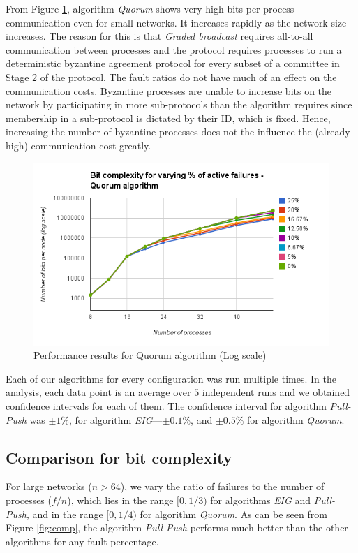 From Figure \ref{fig:quorum}, algorithm \textit{Quorum} shows very high bits
per process communication even for small networks. It increases rapidly as the
network size increases. The reason for this is that \textit{Graded broadcast}
requires all-to-all communication between processes and the protocol requires
processes to run a deterministic byzantine agreement protocol for every subset
of a committee in Stage $2$ of the protocol. The fault ratios do not have much
of an effect on the communication costs. Byzantine processes are unable to
increase bits on the network by participating in more sub-protocols than the
algorithm requires since membership in a sub-protocol is dictated by their ID,
which is fixed. Hence, increasing the number of byzantine processes does not
the influence the (already high) communication cost greatly.
\begin{figure}[ht] \centering \includegraphics[scale=0.4]{quorum}
     \caption{Performance results for Quorum algorithm (Log
    scale)} \label{fig:quorum}  \end{figure}

Each of our algorithms for every configuration was run multiple times. In the
analysis, each data point is an average over $5$ independent runs and we
obtained confidence intervals for each of them. The confidence interval for
algorithm \textit{Pull-Push} was $\pm 1\%$, for algorithm \textit{EIG}---$\pm
0.1\%$, and $\pm 0.5\%$ for algorithm \textit{Quorum}.

\subsection{Comparison for bit complexity} For large networks ($n > 64$), we
vary the ratio of failures to the number of processes ($f/n$), which lies in
the range $[0, 1/3)$ for algorithms \textit{EIG} and \textit{Pull-Push}, and in
    the range $[0, 1/4)$ for algorithm \textit{Quorum}.  As can be seen from
        Figure \ref{fig:comp}, the algorithm \textit{Pull-Push} performs much
        better than the other algorithms for any fault percentage.

